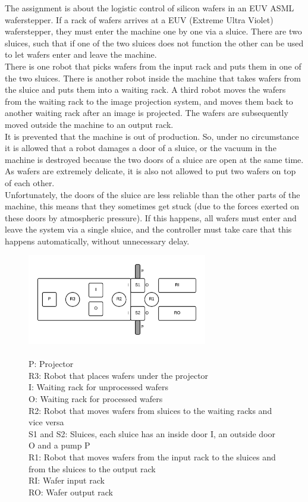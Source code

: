 The assignment is about the logistic control of silicon wafers in an EUV ASML waferstepper. If a rack of wafers arrives at a EUV (Extreme Ultra Violet) waferstepper, they must enter the machine one by one via a sluice. There are two sluices, such that if one of the two sluices does not function the other can be used to let wafers enter and leave the machine.\\

There is one robot that picks wafers from the input rack and puts them in one of the two sluices. There is another robot inside the machine that takes wafers from the sluice and puts them into a waiting rack. A third robot moves the wafers from the waiting rack to the image projection system, and moves them back to another waiting rack after an image is projected. The wafers are subsequently moved outside the machine to an output rack.\\

It is prevented that the machine is out of production. So, under no circumstance it is allowed that a robot damages a door of a sluice, or the vacuum in the machine is destroyed because the two doors of a sluice are open at the same time. As wafers are extremely delicate, it is also not allowed to put two wafers on top of each other.\\

Unfortunately, the doors of the sluice are less reliable than the other parts of the machine, this means that they sometimes get stuck (due to the forces exerted on these doors by atmospheric pressure). If this happens, all wafers must enter and leave the system via a single sluice, and the controller must take care that this happens automatically, without unnecessary delay.

\begin{figure}[h]
    \centering
	\includegraphics[width=0.7\textwidth]{waferstepper.png}
	\caption{\\P: Projector\\R3: Robot that places wafers under the projector\\I: Waiting rack for unprocessed wafers\\O: Waiting rack for processed wafers\\R2: Robot that moves wafers from sluices to the waiting racks and vice versa\\S1 and S2: Sluices, each sluice has an inside door I, an outside door O and a pump P\\R1: Robot that moves wafers from the input rack to the sluices and from the sluices to the output rack\\RI: Wafer input rack\\RO: Wafer output rack}
\end{figure}
